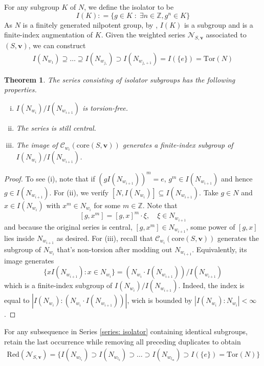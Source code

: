 \documentclass[pdflatex,sn-mathphys-num]{sn-jnl}%
\theoremstyle{thmstyleone}%
\newtheorem{theo}{Theorem}%
\theoremstyle{thmstyletwo}%
\theoremstyle{thmstylethree}%
\begin{document}
For any subgroup $K$ of $N$, we define the isolator to be 
$$I(K) : = \{g \in K\;: \; \exists n \in \mathbb{Z}, g^n \in K \}$$
As $N$ is a finitely generated nilpotent group, by \cite[Theorem 4.5]{Hall_Isolator}, $I(K)$ is a subgroup and is a finite-index augmentation of $K$.
Given the weighted series $ \mathcal{N}_{S, \mathbf v}$ associated to $(S,\mathbf{v})$, we can construct 
\begin{align}
\label{series: isolator}
    I(N_{w_1}) \supseteq 
\ldots \supseteq I(N_{w_{j_*}})   \supset I(N_{w_{j_* + 1}})  = I(\{e\}) = \mbox{Tor}(N)
\end{align}
\begin{theo}
\label{thm: isolator}
    The series consisting of isolator subgroups has the following properties. 
    \begin{enumerate}[(i)]
        \item $I(N_{w_{i}}) /I(N_{w_{i+1}})$ is torsion-free. 
        \item The series is still central. 
        \item The image of  
        $\mathcal{C}_{w_i}(\mbox{core}(S,\mathbf{v}))$ 
       generates a finite-index subgroup of 
       $I(N_{w_{i}}) /I(N_{w_{i+1}})$. 
    \end{enumerate}
\end{theo}
\begin{proof}
To see (i), note that if $(gI(N_{w_{i+1}}))^m = e$, $g^m \in I(N_{w_{i+1}})$ and hence $g \in I(N_{w_{i+1}})$. 
For (ii), we verify  $[N, I(N_{w_i})] \subseteq I(N_{w_{i+1}})$. Take $g \in N$ and $x \in I(N_{w_i})$ with $x^m \in N_{w_i}$ for some $m \in \mathbb{Z}$. Note that 
$$[g, x^m] = [g,x]^m \cdot \xi, \quad \xi \in N_{w_{i+1}}$$
and because the original series is central, $[g,x^m] \in N_{w_{i+1}}$, some power of $[g,x]$ lies inside $N_{w_{i+1}}$ as desired. 
For (iii), recall that $\mathcal{C}_{w_i}(\mbox{core}(S,\mathbf{v}))$ generates the subgroup of $N_{w_i}$ that's non-torsion after modding out $N_{w_{i+1}}$. Equivalently, its image generates $$\{x I(N_{w_{i+1}}) : x\in N_{w_i}\} = (N_{w_i} \cdot I(N_{w_{i+1}}))/ I(N_{w_{i+1}}) 
$$
which is a finite-index subgroup of $I(N_{w_i})/I(N_{w_{i+1}})$. Indeed, the index is equal to $|I(N_{w_i}): (N_{w_i} \cdot I(N_{w_{i+1}}))|$, wich is bounded by $|I(N_{w_i}):N_{w_i}| < \infty$. 
\end{proof}


For any subsequence in Series \ref{series: isolator} containing identical subgroups, retain the last occurrence while removing all preceding duplicates to obtain 
\begin{align*}
 \mbox{Red}( \mathcal{N}_{S, \mathbf v}) = \Big\{ I(N_{w_{l_1}})\supset I(N_{w_{l_2}}) \supset\ldots \supset I(N_{w_{l_{m}}}) \supset   I(\{e\})  = \mbox{Tor}(N)\Big\}
\end{align*}
\end{document}
